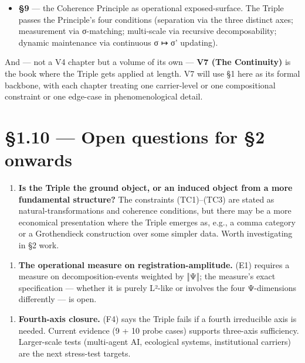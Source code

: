 \documentclass[11pt, openany]{book}
\newcommand{\sectionbreak}{\clearpage}
\begin{document}
\begin{itemize}
\item \textbf{§9} --- the Coherence Principle as operational exposed-surface. The Triple passes the Principle's four conditions (separation via the three distinct axes; measurement via σ-matching; multi-scale via recursive decomposability; dynamic maintenance via continuous σ ↦ σ' updating).
\end{itemize}

And --- not a V4 chapter but a volume of its own --- \textbf{V7 (The Continuity)} is the book where the Triple gets applied at length. V7 will use §1 here as its formal backbone, with each chapter treating one carrier-level or one compositional constraint or one edge-case in phenomenological detail.

\sectionbreak

\section{§1.10 --- Open questions for §2 onwards}

\begin{enumerate}
\item \textbf{Is the Triple the ground object, or an induced object from a more fundamental structure?} The constraints (TC1)–(TC3) are stated as natural-transformations and coherence conditions, but there may be a more economical presentation where the Triple emerges as, e.g., a comma category or a Grothendieck construction over some simpler data. Worth investigating in §2 work.
\end{enumerate}

\begin{enumerate}
\item \textbf{The operational measure on registration-amplitude.} (E1) requires a measure on decomposition-events weighted by ‖Ψ‖; the measure's exact specification --- whether it is purely L²-like or involves the four Ψ-dimensions differently --- is open.
\end{enumerate}

\begin{enumerate}
\item \textbf{Fourth-axis closure.} (F4) says the Triple fails if a fourth irreducible axis is needed. Current evidence (9 + 10 probe cases) supports three-axis sufficiency. Larger-scale tests (multi-agent AI, ecological systems, institutional carriers) are the next stress-test targets.
\end{enumerate}
\end{document}
